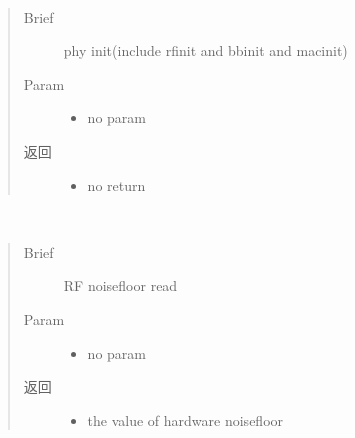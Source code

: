\documentclass[letterpaper,10pt,english]{sphinxhowto}
\begin{document}
\begin{fulllineitems}
\begin{fulllineitems}
\end{fulllineitems}


\begin{fulllineitems}
\label{\detokenize{rfapi/index:wifi_api.WIFIAPI.phyinit}}~\begin{quote}\begin{description}
\item[{Brief}] \leavevmode
phy init(include rfinit and bbinit and macinit)

\item[{Param}] \leavevmode\begin{itemize}
\item {} 
no param

\end{itemize}

\item[{返回}] \leavevmode
\begin{itemize}
\item {} 
no return

\end{itemize}


\end{description}\end{quote}

\end{fulllineitems}


\begin{fulllineitems}
\label{\detokenize{rfapi/index:wifi_api.WIFIAPI.read_hw_noisefloor}}~\begin{quote}\begin{description}
\item[{Brief}] \leavevmode
RF noisefloor read

\item[{Param}] \leavevmode\begin{itemize}
\item {} 
no param

\end{itemize}

\item[{返回}] \leavevmode
\begin{itemize}
\item {} 
the value of hardware noisefloor


\end{itemize}
\end{description}
\end{quote}
\end{fulllineitems}
\end{fulllineitems}
\end{document}
